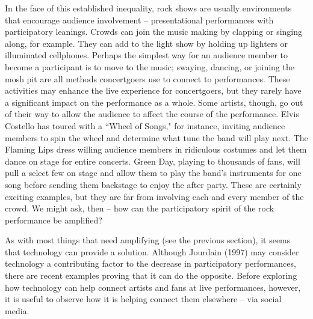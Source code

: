 In the face of this established inequality, rock shows are usually environments that encourage audience involvement -- presentational performances with participatory leanings. Crowds can join the music making by clapping or singing along, for example. They can add to the light show by holding up lighters or illuminated cellphones. Perhaps the simplest way for an audience member to become a participant is to move to the music; swaying, dancing, or joining the mosh pit are all methods concertgoers use to connect to performances. These activities may enhance the live experience for concertgoers, but they rarely have a significant impact on the performance as a whole. Some artists, though, go out of their way to allow the audience to affect the course of the performance. Elvis Costello has toured with a ``Wheel of Songs," for instance, inviting audience members to spin the wheel and determine what tune the band will play next. The Flaming Lips dress willing audience members in ridiculous costumes and let them dance on stage for entire concerts. Green Day, playing to thousands of fans, will pull a select few on stage and allow them to play the band's instruments for one song before sending them backstage to enjoy the after party. These are certainly exciting examples, but they are far from involving each and every member of the crowd. We might ask, then -- how can the participatory spirit of the rock performance be amplified?

As with most things that need amplifying (see the previous section), it seems that technology can provide a solution. Although Jourdain (1997) may consider technology a contributing factor to the decrease in participatory performances, there are recent examples proving that it can do the opposite. Before exploring how technology can help connect artists and fans at live performances, however, it is useful to observe how it is helping connect them elsewhere -- via social media.

